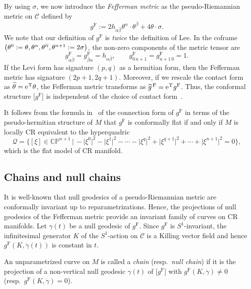 \documentclass[pdftex]{sigma}
\renewcommand\a{\alpha}
\renewcommand\b{\beta}
\newcommand\g{\gamma}
\renewcommand\th{\theta}
\newcommand\ol{\overline}
\newcommand{\wh}{\widehat}
\numberwithin{equation}{section}
\begin{document}
By using $\sigma$, we now introduce the {\it Fefferman metric} as the pseudo-Riemannian metric on $\mathcal{C}$ defined by
\[
g^{\mathrm{F}}:=2h_{\a\ol\b}\theta^\a\cdot \theta^{\ol\b}+4\theta\cdot \sigma.
\]
We note that our definition of $g^{\mathrm{F}}$ is {\it twice} the definition of Lee. In the coframe $\smash{\bigl(\th^0:=\th, \th^\a, \th^{\ol\a}},\allowbreak \smash{\th^{n+1}:=2\sigma\bigr)}$, the non-zero components of the metric tensor are
\[
g^{\mathrm{F}}_{\a\ol\b}=g^{\mathrm{F}}_{\ol\b\a}=h_{\a\ol\b}, \qquad
g^{\mathrm{F}}_{0\, n+1}=g^{\mathrm{F}}_{n+1\, 0}=1.
\]
If the Levi form has signature $(p, q)$ as a hermitian form, then the Fefferman metric has signature $(2p+1, 2q+1)$. Moreover, if we rescale the contact form
as $\wh\th={\rm e}^\Upsilon\th$, the Fefferman metric transforms as
$\wh{g}^{\,\mathrm{F}}={\rm e}^\Upsilon g^{\mathrm{F}}$. Thus, the conformal structure $\bigl[g^{\mathrm{F}}\bigr]$ is independent of the choice of contact form~\cite[Theorem~5.17]{Lee}.

It follows from the formula in~\cite{Lee} of the connection form of $g^{\mathrm{F}}$ in terms of the pseudo-hermitian structure of $M$ that $g^{\mathrm{F}}$ is conformally flat if and only if $M$ is locally CR equivalent to the hyperquadric
\[
\mathcal{Q}=\bigl\{[\xi]\in \mathbb{CP}^{n+1} \,\big|\, -\bigl|\xi^0\bigr|^2-\bigl|\xi^1\bigr|^2-\cdots-
\bigl|\xi^q\bigr|^2+\bigl|\xi^{q+1}\bigr|^2+\cdots+\bigl|\xi^{n+1}\bigr|^2=0 \bigr\},
\]
which is the flat model of CR manifold.

\subsection{Chains and null chains}
It is well-known that null geodesics of a pseudo-Riemannian metric are conformally invariant up to reparametrizations. Hence, the projections of null geodesics of the Fefferman metric provide an invariant family of curves on CR manifolds. Let $\g(t)$ be a null geodesic of $g^{\mathrm{F}}$. Since $g^{\mathrm{F}}$ is $S^1$-invariant, the infinitesimal generator $K$ of the $S^1$-action on $\mathcal{C}$ is a Killing vector field and hence $g^{\mathrm{F}}(K, \dot\g(t))$ is constant in $t$.

\begin{Definition}
An unparametrized curve on $M$ is called a {\it chain} (resp.\ {\it null chain}) if it is the projection of a non-vertical null geodesic $\g(t)$ of $\bigl[g^{\mathrm{F}}\bigr]$ with $g^{\mathrm{F}}(K, \dot\g)\neq0$ \big(resp.\ $g^{\mathrm{F}}(K, \dot\g)=0$\big).
\end{Definition}
\end{document}
